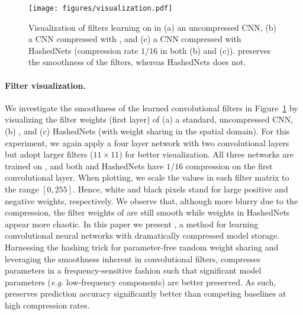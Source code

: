 \documentclass{article} %
\begin{document}
\begin{figure}
	\center
    \texttt{[image: figures/visualization.pdf]}
    \caption{Visualization of filters learning on  in (a) an uncompressed CNN, (b) a CNN compressed with \abbrev{}, and (c) a CNN compressed with HashedNets (compression rate $1/16$ in both (b) and (c)). \abbrev{} preserves the smoothness of the filters, whereas  HashedNets does not.}
    \label{fig:visual}
\end{figure}\paragraph{Filter visualization.}
We investigate the smoothness of the learned convolutional filters in Figure~\ref{fig:visual} by visualizing the filter weights (first layer) of (a) a standard, uncompressed CNN, (b) \abbrev{}, and (c) HashedNets (with weight sharing in the spatial domain).
For this experiment, we again apply a four layer network with two convolutional layers but adopt larger filters ($11\times 11$) for better visualization.
All three networks are trained on , and both \abbrev{} and HashedNets have $1/16$ compression on the first convolutional layer.
When plotting, we scale the values in each filter matrix to the range $[0,255]$.
Hence, white and black pixels stand for large positive and negative weights, respectively.
We observe that, although more blurry due to the compression, the filter weights of \abbrev{} are still smooth while weights in HashedNets appear more chaotic.
In this paper we present \abbrev{}, a method for learning convolutional neural networks with dramatically compressed model storage.
Harnessing the hashing trick for parameter-free random weight sharing and leveraging the smoothness inherent in convolutional filters, \abbrev{} compresses parameters in a frequency-sensitive fashion such that significant model parameters (\emph{e.g.} low-frequency components) are better preserved.
As such, \abbrev{} preserves prediction accuracy significantly better than competing baselines at high compression rates.

{
\small


}
\end{document}
